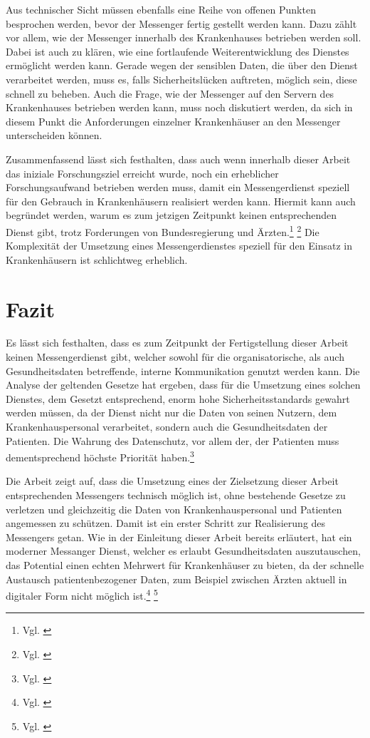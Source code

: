 Aus technischer Sicht müssen ebenfalls eine Reihe von offenen Punkten besprochen werden, bevor der Messenger fertig gestellt werden kann.
Dazu zählt vor allem, wie der Messenger innerhalb des Krankenhauses betrieben werden soll. Dabei ist auch zu klären, wie eine fortlaufende Weiterentwicklung des Dienstes ermöglicht werden kann. Gerade wegen der sensiblen Daten, die über den Dienst verarbeitet werden, muss es, falls Sicherheitslücken auftreten, möglich sein, diese schnell zu beheben. Auch die Frage, wie der Messenger auf den Servern des Krankenhauses betrieben werden kann, muss noch diskutiert werden, da sich in diesem Punkt die Anforderungen einzelner Krankenhäuser an den Messenger unterscheiden können.

Zusammenfassend lässt sich festhalten, dass auch wenn innerhalb dieser Arbeit das iniziale Forschungsziel erreicht wurde, noch ein erheblicher Forschungsaufwand betrieben werden muss, damit ein Messengerdienst speziell für den Gebrauch in Krankenhäusern realisiert werden kann. Hiermit kann auch begründet werden, warum es zum jetzigen Zeitpunkt keinen entsprechenden Dienst gibt, trotz Forderungen von Bundesregierung und Ärzten.\footnote{Vgl. \cite[S. 1 ff.]{Datenschutzkonferenz2019}} \footnote{Vgl. \cite{Giesselmann2018}} Die Komplexität der Umsetzung eines Messengerdienstes speziell für den Einsatz in Krankenhäusern ist schlichtweg erheblich.

\section{Fazit}\label{chapter:fazit}


Es lässt sich festhalten, dass es zum Zeitpunkt der Fertigstellung dieser Arbeit keinen Messengerdienst gibt, welcher sowohl für die organisatorische, als auch Gesundheitsdaten betreffende, interne Kommunikation genutzt werden kann. Die Analyse der geltenden Gesetze hat ergeben, dass für die Umsetzung eines solchen Dienstes, dem Gesetzt entsprechend, enorm hohe Sicherheitsstandards gewahrt werden müssen, da der Dienst nicht nur die Daten von seinen Nutzern, dem Krankenhauspersonal verarbeitet, sondern auch die Gesundheitsdaten der Patienten. Die Wahrung des Datenschutz, vor allem der, der Patienten muss dementsprechend höchste Priorität haben.\footnote{Vgl. \cite[S. 110 ff.]{Camphausen2019}}

Die Arbeit zeigt auf, dass die Umsetzung eines der Zielsetzung dieser Arbeit entsprechenden Messengers technisch möglich ist, ohne bestehende Gesetze zu verletzen und gleichzeitig die Daten von Krankenhauspersonal und Patienten angemessen zu schützen.
Damit ist ein erster Schritt zur Realisierung des Messengers getan. Wie in der Einleitung dieser Arbeit bereits erläutert, hat ein moderner Messanger Dienst, welcher es erlaubt Gesundheitsdaten auszutauschen, das Potential einen echten Mehrwert für Krankenhäuser zu bieten, da der schnelle Austausch patientenbezogener Daten, zum Beispiel zwischen Ärzten aktuell in digitaler Form nicht möglich ist.\footnote{Vgl. \cite[S. 1292 f.]{G.Murphy2010}} \footnote{Vgl. \cite[S. 597 f.]{Moghimi2016}}


